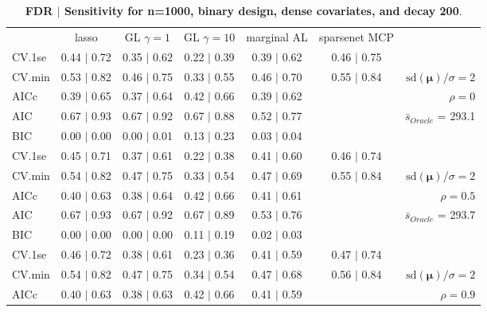 \clearpage
\begin{table}\vspace{-.5cm}
\caption[l]{ {\it }
{ \bf FDR $\boldsymbol{\mid}$ Sensitivity for n=1000, binary design, dense covariates, and  decay  200}.}
\vspace{-.5cm}
\footnotesize{}
\begin{center}
\begin{tabular}{l*{5}{c}|r}
 & lasso & GL $\gamma=1$ & GL $\gamma=10$ & marginal AL & sparsenet MCP  & \\
 \cline{1-7}
CV.1se & 0.44 $\mid$ 0.72 & 0.35 $\mid$ 0.62 & 0.22 $\mid$ 0.39 & 0.39 $\mid$ 0.62 & 0.46 $\mid$ 0.75 & \\
CV.min & 0.53 $\mid$ 0.82 & 0.46 $\mid$ 0.75 & 0.33 $\mid$ 0.55 & 0.46 $\mid$ 0.70 & 0.55 $\mid$ 0.84 &  $\mathrm{sd}(\mathbf{\mu})/\sigma=2$ \\
AICc & 0.39 $\mid$ 0.65 & 0.37 $\mid$ 0.64 & 0.42 $\mid$ 0.66 & 0.39 $\mid$ 0.62 & & $\rho=0$ \\
AIC & 0.67 $\mid$ 0.93 & 0.67 $\mid$ 0.92 & 0.67 $\mid$ 0.88 & 0.52 $\mid$ 0.77 & &  \multirow{2}{*}{$\bar{s}_{Oracle}$ = 293.1} \\
BIC & 0.00 $\mid$ 0.00 & 0.00 $\mid$ 0.01 & 0.13 $\mid$ 0.23 & 0.03 $\mid$ 0.04 & &  \\
 \hline 
CV.1se & 0.45 $\mid$ 0.71 & 0.37 $\mid$ 0.61 & 0.22 $\mid$ 0.38 & 0.41 $\mid$ 0.60 & 0.46 $\mid$ 0.74 & \\
CV.min & 0.54 $\mid$ 0.82 & 0.47 $\mid$ 0.75 & 0.33 $\mid$ 0.54 & 0.47 $\mid$ 0.69 & 0.55 $\mid$ 0.84 &  $\mathrm{sd}(\mathbf{\mu})/\sigma=2$ \\
AICc & 0.40 $\mid$ 0.63 & 0.38 $\mid$ 0.64 & 0.42 $\mid$ 0.66 & 0.41 $\mid$ 0.61 & & $\rho=0.5$ \\
AIC & 0.67 $\mid$ 0.93 & 0.67 $\mid$ 0.92 & 0.67 $\mid$ 0.89 & 0.53 $\mid$ 0.76 & &  \multirow{2}{*}{$\bar{s}_{Oracle}$ = 293.7} \\
BIC & 0.00 $\mid$ 0.00 & 0.00 $\mid$ 0.00 & 0.11 $\mid$ 0.19 & 0.02 $\mid$ 0.03 & &  \\
 \hline 
CV.1se & 0.46 $\mid$ 0.72 & 0.38 $\mid$ 0.61 & 0.23 $\mid$ 0.36 & 0.41 $\mid$ 0.59 & 0.47 $\mid$ 0.74 & \\
CV.min & 0.54 $\mid$ 0.82 & 0.47 $\mid$ 0.75 & 0.34 $\mid$ 0.54 & 0.47 $\mid$ 0.68 & 0.56 $\mid$ 0.84 &  $\mathrm{sd}(\mathbf{\mu})/\sigma=2$ \\
AICc & 0.40 $\mid$ 0.63 & 0.38 $\mid$ 0.63 & 0.42 $\mid$ 0.66 & 0.41 $\mid$ 0.59 & & $\rho=0.9$ \\

\end{tabular}
\end{center}
\end{table}

